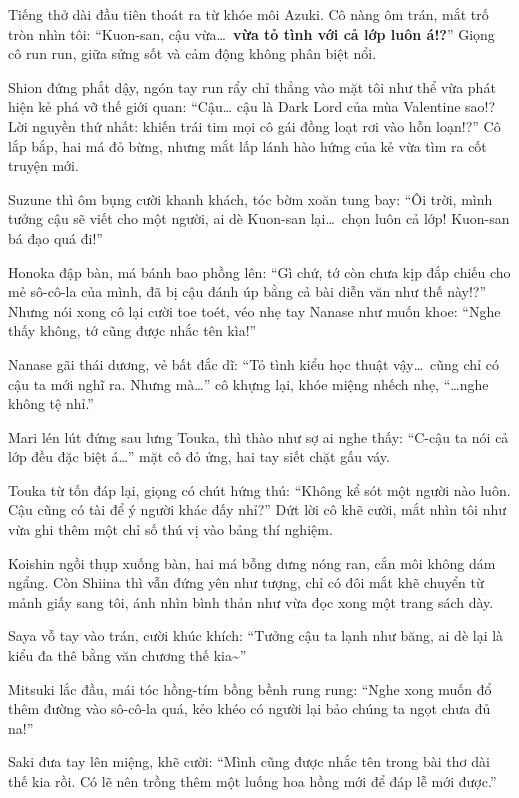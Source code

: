 \documentclass[../main.tex]{subfiles}
\begin{document}
Tiếng thở dài đầu tiên thoát ra từ khóe môi Azuki. Cô nàng ôm trán, mắt trố tròn nhìn tôi: ``Kuon-san, cậu vừa\dots\ \textbf{vừa tỏ tình với cả lớp luôn á!?}'' Giọng cô run run, giữa sửng sốt và cảm động không phân biệt nổi.

Shion đứng phắt dậy, ngón tay run rẩy chỉ thẳng vào mặt tôi như thể vừa phát hiện kẻ phá vỡ thế giới quan: ``Cậu… cậu là Dark Lord của mùa Valentine sao!? Lời nguyền thứ nhất: khiến trái tim mọi cô gái đồng loạt rơi vào hỗn loạn!?'' Cô lắp bắp, hai má đỏ bừng, nhưng mắt lấp lánh hào hứng của kẻ vừa tìm ra cốt truyện mới.

Suzune thì ôm bụng cười khanh khách, tóc bờm xoăn tung bay: ``Ôi trời, mình tưởng cậu sẽ viết cho một người, ai dè Kuon-san lại\dots\ chọn luôn cả lớp! Kuon-san bá đạo quá đi!''

Honoka đập bàn, má bánh bao phồng lên: ``Gì chứ, tớ còn chưa kịp đắp chiếu cho mẻ sô-cô-la của mình, đã bị cậu đánh úp bằng cả bài diễn văn như thế này!?'' Nhưng nói xong cô lại cười toe toét, véo nhẹ tay Nanase như muốn khoe: ``Nghe thấy không, tớ cũng được nhắc tên kìa!''

Nanase gãi thái dương, vẻ bất đắc dĩ: ``Tỏ tình kiểu học thuật vậy\dots\ cũng chỉ có cậu ta mới nghĩ ra. Nhưng mà\dots'' cô khựng lại, khóe miệng nhếch nhẹ, ``\dots nghe không tệ nhỉ.''

Mari lén lút đứng sau lưng Touka, thì thào như sợ ai nghe thấy: ``C-cậu ta nói cả lớp đều đặc biệt á\dots'' mặt cô đỏ ửng, hai tay siết chặt gấu váy.

Touka từ tốn đáp lại, giọng có chút hứng thú: ``Không kể sót một người nào luôn. Cậu cũng có tài để ý người khác đấy nhỉ?'' Dứt lời cô khẽ cười, mắt nhìn tôi như vừa ghi thêm một chỉ số thú vị vào bảng thí nghiệm.

Koishin ngồi thụp xuống bàn, hai má bỗng dưng nóng ran, cắn môi không dám ngẩng. Còn Shiina thì vẫn đứng yên như tượng, chỉ có đôi mắt khẽ chuyển từ mảnh giấy sang tôi, ánh nhìn bình thản như vừa đọc xong một trang sách dày.

Saya vỗ tay vào trán, cười khúc khích: ``Tưởng cậu ta lạnh như băng, ai dè lại là kiểu đa thê bằng văn chương thế kia\~{}''

Mitsuki lắc đầu, mái tóc hồng-tím bồng bềnh rung rung: ``Nghe xong muốn đổ thêm đường vào sô-cô-la quá, kẻo khéo có người lại bảo chúng ta ngọt chưa đủ na!''

Saki đưa tay lên miệng, khẽ cười: ``Mình cũng được nhắc tên trong bài thơ dài thế kia rồi. Có lẽ nên trồng thêm một luống hoa hồng mới để đáp lễ mới được.''
\end{document}
